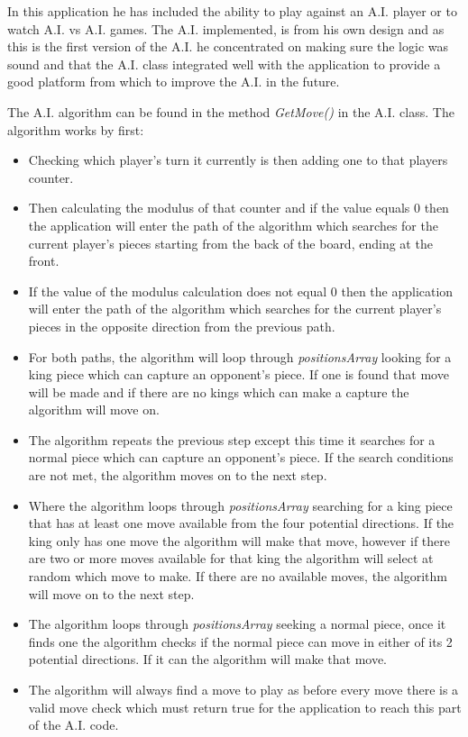 \documentclass[10pt, a4paper]{article}
\begin{document}
 In this application he has included the ability to play against an A.I. player or to watch A.I. vs A.I. games. The A.I. implemented, is from his own design and as this is the first version of the A.I. he concentrated on making sure the logic was sound and that the A.I. class integrated well with the application to provide a good platform from which to improve the A.I. in the future.
 
 The A.I. algorithm can be found in the method \textit{GetMove()} in the A.I. class. The algorithm works by first:  	
 
 
 \begin{itemize}
 	\item Checking which player's turn it currently is then adding one to that players counter.    		
 	\item Then calculating the modulus of that counter and if the value equals 0 then the application will enter the path of the algorithm which searches for the current player's pieces starting from the back of the board, ending at the front. 
 	\item If the value of the modulus calculation does not equal 0 then the application will enter the path of the algorithm which searches for the current player's pieces in the opposite direction from the previous path.
 	\item For both paths, the algorithm will loop through \textit{positionsArray} looking for a king piece which can capture an opponent's piece. If one is found that move will be made and if there are no kings which can make a capture the algorithm will move on. 
 	\item The algorithm repeats the previous step except this time it searches for a normal piece which can capture an opponent's piece. If the search conditions are not met, the algorithm moves on to the next step.
 	\item Where the algorithm loops through \textit{positionsArray} searching for a king piece that has at least one move available from the four potential directions. If the king only has one move the algorithm will make that move, however if there are two or more moves available for that king the algorithm will select at random which move to make. If there are no available moves, the algorithm will move on to the next step.
 	\item The algorithm loops through \textit{positionsArray} seeking a normal piece, once it finds one the algorithm checks if the normal piece can move in either of its 2 potential directions. If it can the algorithm will make that move.
 	\item The algorithm will always find a move to play as before every move there is a valid move check which must return true for the application to reach this part of the A.I. code.    		
 \end{itemize}
 
\end{document}

